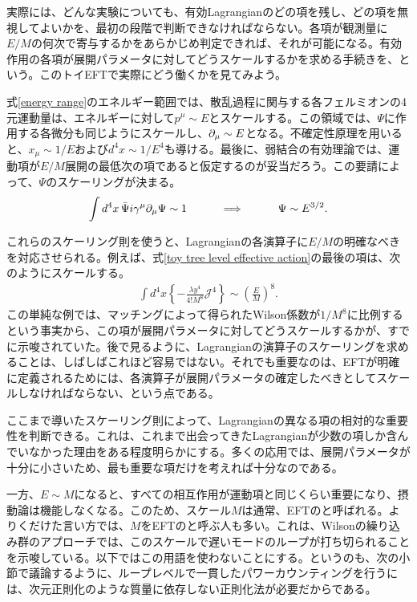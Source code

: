実際には、どんな実験についても、有効Lagrangianのどの項を残し、どの項を無視してよいかを、最初の段階で判断できなければならない。各項が観測量に$E/M$の何次で寄与するかをあらかじめ判定できれば、それが可能になる。有効作用の各項が展開パラメータに対してどうスケールするかを求める手続きを、という。このトイEFTで実際にどう働くかを見てみよう。

式\eqref{energy range}のエネルギー範囲では、散乱過程に関与する各フェルミオンの4元運動量は、エネルギーに対して$p^\mu \sim E$とスケールする。この領域では、$\Psi$に作用する各微分も同じようにスケールし、$\partial_\mu \sim E$となる。不確定性原理を用いると、$x_\mu \sim 1/E$および$d^4 x \sim 1/E^4$も導ける。最後に、弱結合の有効理論では、運動項が$E/M$展開の最低次の項であると仮定するのが妥当だろう。この要請によって、$\Psi$のスケーリングが決まる。
%
\begin{align} \label	{scaling Psi toy model}
\int d^4 x \, \bar \Psi i \gamma^\mu \partial_\mu \Psi \sim 1 \qquad\quad  \Longrightarrow \qquad\quad  \Psi \sim E^{3/2} .
\end{align}
%

これらのスケーリング則を使うと、Lagrangianの各演算子に$E/M$の明確なべきを対応させられる。例えば、式\eqref{toy tree level effective action}の最後の項は、次のようにスケールする。
%
\begin{align}
	\int d^4 x \left\{ - \frac{\lambda y^4}{4!M^8}\mathcal{J}^4 \right\} \sim \left(\frac{E}{M} \right)^8.
\end{align}
%
この単純な例では、マッチングによって得られたWilson係数が$1/M^8$に比例するという事実から、この項が展開パラメータに対してどうスケールするかが、すでに示唆されていた。後で見るように、Lagrangianの演算子のスケーリングを求めることは、しばしばこれほど容易ではない。それでも重要なのは、EFTが明確に定義されるためには、各演算子が展開パラメータの確定したべきとしてスケールしなければならない、という点である。

ここまで導いたスケーリング則によって、Lagrangianの異なる項の相対的な重要性を判断できる。これは、これまで出会ってきたLagrangianが少数の項しか含んでいなかった理由をある程度明らかにする。多くの応用では、展開パラメータが十分に小さいため、最も重要な項だけを考えれば十分なのである。

一方、$E \sim M$になると、すべての相互作用が運動項と同じくらい重要になり、摂動論は機能しなくなる。このため、スケール$M$は通常、EFTのと呼ばれる。よりくだけた言い方では、$M$をEFTのと呼ぶ人も多い。これは、Wilsonの繰り込み群のアプローチでは、このスケールで遅いモードのループが打ち切られることを示唆している。以下ではこの用語を使わないことにする。というのも、次の小節で議論するように、ループレベルで一貫したパワーカウンティングを行うには、次元正則化のような質量に依存しない正則化法が必要だからである。

